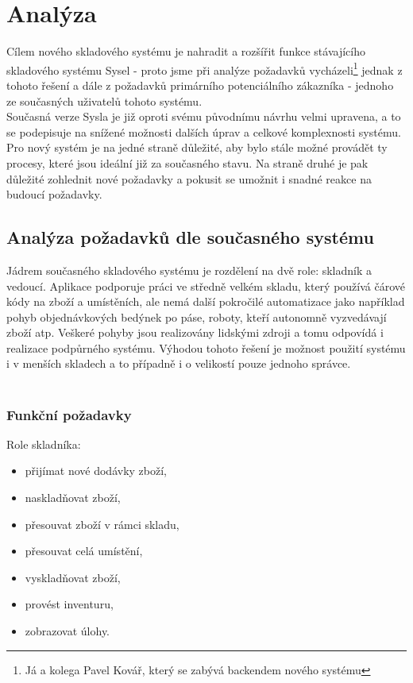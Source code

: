 \chapter{Analýza}

Cílem nového skladového systému je nahradit a rozšířit funkce stávajícího skladového systému Sysel - proto jsme při analýze požadavků vycházeli\footnote{Já a kolega Pavel Kovář, který se zabývá backendem nového systému} jednak z tohoto řešení a dále z požadavků primárního potenciálního zákazníka - jednoho ze současných uživatelů tohoto systému.\\
Současná verze Sysla je již oproti svému původnímu návrhu velmi upravena, a to se podepisuje na snížené možnosti dalších úprav a celkové komplexnosti systému.\\
Pro nový systém je na jedné straně důležité, aby bylo stále možné provádět ty procesy, které jsou ideální již za současného stavu. Na straně druhé je pak důležité zohlednit nové požadavky a pokusit se umožnit i snadné reakce na budoucí požadavky.

\section{Analýza požadavků dle současného systému}

Jádrem současného skladového systému je rozdělení na dvě role: skladník a vedoucí. Aplikace podporuje práci ve středně velkém skladu, který používá čárové kódy na zboží a umístěních, ale nemá další pokročilé automatizace jako například pohyb objednávkových bedýnek po páse, roboty, kteří autonomně vyzvedávají zboží atp. Veškeré pohyby jsou realizovány lidskými zdroji a tomu odpovídá i realizace podpůrného systému. Výhodou tohoto řešení je možnost použití systému i v menších skladech a to případně i o velikostí pouze jednoho správce.\\
\\
\subsection{Funkční požadavky}

Role skladníka:
\begin{itemize}
	\item přijímat nové dodávky zboží,
	\item naskladňovat zboží,
	\item přesouvat zboží v rámci skladu,
	\item přesouvat celá umístění,
	\item vyskladňovat zboží,
	\item provést inventuru,
	\item zobrazovat úlohy.
\end{itemize}

